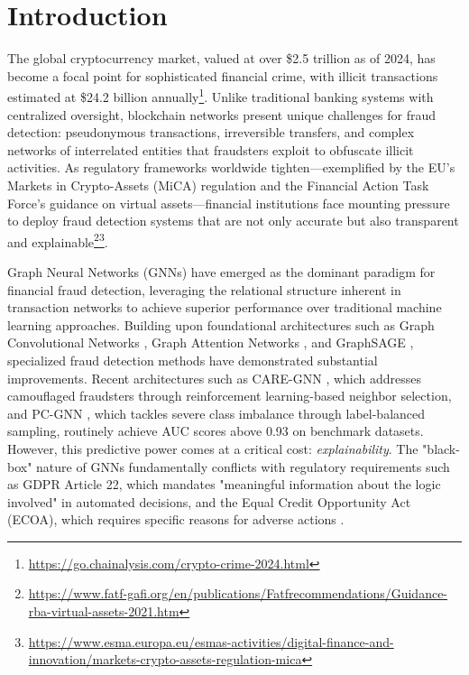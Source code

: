 \section{Introduction}

The global cryptocurrency market, valued at over \$2.5 trillion as of 2024, has become a focal point for sophisticated financial crime, with illicit transactions estimated at \$24.2 billion annually\footnote{\url{https://go.chainalysis.com/crypto-crime-2024.html}}. Unlike traditional banking systems with centralized oversight, blockchain networks present unique challenges for fraud detection: pseudonymous transactions, irreversible transfers, and complex networks of interrelated entities that fraudsters exploit to obfuscate illicit activities. As regulatory frameworks worldwide tighten—exemplified by the EU's Markets in Crypto-Assets (MiCA) regulation and the Financial Action Task Force's guidance on virtual assets—financial institutions face mounting pressure to deploy fraud detection systems that are not only accurate but also transparent and explainable\footnote{\url{https://www.fatf-gafi.org/en/publications/Fatfrecommendations/Guidance-rba-virtual-assets-2021.htm}}\footnote{\url{https://www.esma.europa.eu/esmas-activities/digital-finance-and-innovation/markets-crypto-assets-regulation-mica}}.

Graph Neural Networks (GNNs) have emerged as the dominant paradigm for financial fraud detection, leveraging the relational structure inherent in transaction networks to achieve superior performance over traditional machine learning approaches. Building upon foundational architectures such as Graph Convolutional Networks \citep{kipf2017gcn, asiri2025graph}, Graph Attention Networks \citep{velickovic2018gat, fu2026phishing}, and GraphSAGE \citep{hamilton2017graphsage, tang2025application}, specialized fraud detection methods have demonstrated substantial improvements. Recent architectures such as CARE-GNN \citep{dou2020caregnn}, which addresses camouflaged fraudsters through reinforcement learning-based neighbor selection, and PC-GNN \citep{liu2021pcgnn}, which tackles severe class imbalance through label-balanced sampling, routinely achieve AUC scores above 0.93 on benchmark datasets. However, this predictive power comes at a critical cost: \textit{explainability}. The "black-box" nature of GNNs fundamentally conflicts with regulatory requirements such as GDPR Article 22, which mandates "meaningful information about the logic involved" in automated decisions, and the Equal Credit Opportunity Act (ECOA), which requires specific reasons for adverse actions \citep{ecoa1974}.

